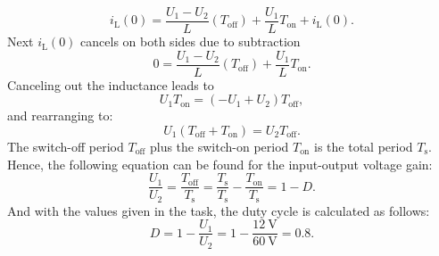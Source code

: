 \begin{solutionblock}
	\begin{equation}
		i_{\mathrm{L}}(0) = \frac{U_{\mathrm{1}}-U_{\mathrm{2}} }{L} (T_{\mathrm{off}})+\frac{U_{\mathrm{1}}}{L}T_{\mathrm{on}}+i_{\mathrm{L}}(0).
	\end{equation}
	Next $i_{\mathrm{L}}(0)$ cancels on both sides due to subtraction
	\begin{equation}
		0 = \frac{U_{\mathrm{1}}-U_{\mathrm{2}} }{L} (T_{\mathrm{off}})+\frac{U_{\mathrm{1}}}{L}T_{\mathrm{on}}.
	\end{equation}
	Canceling out the inductance leads to
	\begin{equation}
		U_{\mathrm{1}}T_{\mathrm{on}}= (-U_{\mathrm{1}}+U_{\mathrm{2}})T_{\mathrm{off}},
	\end{equation}
	and rearranging to:
	\begin{equation}
		U_{\mathrm{1}}(T_{\mathrm{off}}+T_{\mathrm{on}})=  U_{\mathrm{2}}T_{\mathrm{off}}.
	\end{equation}
	The switch-off period $T_{\mathrm{off}}$ plus the switch-on period $T_{\mathrm{on}}$ is the total period $T_{\mathrm{s}}$. Hence, the following equation can be found for the input-output voltage gain:
	\begin{equation}
		\frac{U_{\mathrm{1}}}{U_{\mathrm{2}}}= \frac{T_{\mathrm{off}}}{T_{\mathrm{s}}}= \frac{T_{\mathrm{s}}}{T_{\mathrm{s}}}-\frac{T_{\mathrm{on}}}{T_{\mathrm{s}}} = 1-D.
	\end{equation}
	And with the values given in the task, the duty cycle is calculated as follows:
	\begin{equation}
		D = 1-\frac{U_{\mathrm{1}}}{U_{\mathrm{2}}} = 1- \frac {\SI{12}{\volt}} {\SI{60}{\volt}} = 0.8.
	\end{equation}
\end{solutionblock}


